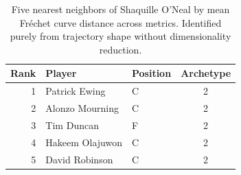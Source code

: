 \begin{table}[htbp]
  \centering\small
  \begin{tabular}{rllc}
    \toprule
    Rank & Player & Position & Archetype \\
    \midrule
    1 & Patrick Ewing & C & 2 \\
    2 & Alonzo Mourning & C & 2 \\
    3 & Tim Duncan & F & 2 \\
    4 & Hakeem Olajuwon & C & 2 \\
    5 & David Robinson & C & 2 \\
    \bottomrule
  \end{tabular}
  \caption{Five nearest neighbors of Shaquille O'Neal by mean Fr\'{e}chet curve distance across metrics. Identified purely from trajectory shape without dimensionality reduction.}
  \label{tab:Shaquille_O_Neal_frechet_curve_neighbors}
\end{table}

